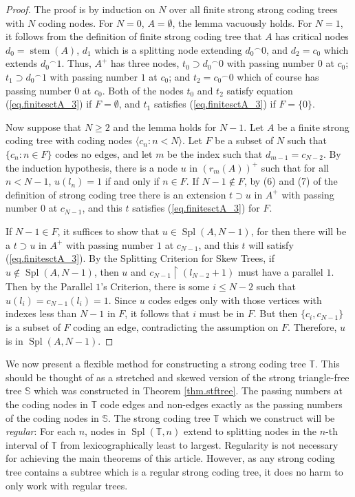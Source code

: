 \documentclass{amsart}
\theoremstyle{remark}
\theoremstyle{definition}
\theoremstyle{remark}
\DeclareMathOperator{\stem}{stem}
\DeclareMathOperator{\Spl}{Spl}
\newcommand{\re}{\restriction}
\newcommand{\bT}{\mathbb{T}}
\newcommand{\bS}{\mathbb{S}}
\newcommand{\lgl}{\langle}
\newcommand{\rgl}{\rangle}
\newcommand{\POC}{Parallel $1$'s Criterion}
\begin{document}
\begin{proof}
The proof is by induction on $N$ over all finite  strong  strong coding trees with $N$ coding nodes.
For $N=0$, $A=\emptyset$, the lemma vacuously holds.
For $N=1$,
it follows from the definition of finite strong coding tree that
$A$ has critical nodes $d_0=\stem(A)$, $d_1$ which is a splitting node extending ${d_0}^{\frown}0$,
and $d_2=c_0$ which extends ${d_0}^{\frown}1$.
Thus, $A^+$ has three nodes, $t_0\supset {d_0}^{\frown}0$ with passing number $0$ at $c_0$;
$t_1\supset {d_0}^{\frown}1$ with passing number $1$ at $c_0$;
and $t_2={c_0}^{\frown}0$ which of course has passing number $0$ at $c_0$.
Both of the nodes $t_0$ and $t_2$ satisfy equation (\ref{eq.finitesctA_3}) if $F=\emptyset$,
and $t_1$ satisfies (\ref{eq.finitesctA_3}) if $F=\{0\}$.


Now suppose that $N\ge 2$ and  the lemma holds for  $N-1$.
Let $A$ be a finite strong coding tree with coding nodes $\lgl c_n:n<N\rgl$.
Let $F$ be a subset of $N$ such that $\{c_n:n\in F\}$ codes no edges,
and let $m$ be the index such that $d_{m-1}=c_{N-2}$.
By the induction hypothesis, there is a node $u$ in
$(r_m(A))^+$ such that
for all $n<N-1$, $u(l_n)=1$ if and only if $n\in F$.
If  $N-1\not\in F$,
by (6) and (7) of the definition of strong coding tree
there is an extension $t\supset u$ in $A^+$ with passing number $0$ at $c_{N-1}$,
and this $t$ satisfies (\ref{eq.finitesctA_3}) for $F$.


If  $N-1\in F$,
it suffices to show that $u\in\Spl(A,N-1)$,
for then there will be a $t\supset u$ in $A^+$ with passing number $1$ at $c_{N-1}$, and this $t$ will satisfy
(\ref{eq.finitesctA_3}).
By the Splitting Criterion for Skew Trees,
if $u\not\in\Spl(A,N-1)$,
then $u$ and $c_{N-1}\re (l_{N-2}+1)$ must have a parallel $1$.
Then by the \POC,
 there is some $i\le N-2$ such that $u(l_i)=c_{N-1}(l_i)=1$.
Since  $u$ codes edges only with those vertices with indexes
less than $N-1$  in $F$,
it follows that $i$ must be in $F$.
But then $\{c_i,c_{N-1}\}$ is a subset of $F$ coding an edge, contradicting the assumption on $F$.
Therefore,  $u$ is in $\Spl(A,N-1)$.
\end{proof}



We now present a flexible method for constructing a strong coding tree $\bT$.
This should be thought of as a stretched and skewed version of the strong triangle-free tree $\bS$ which was constructed in Theorem \ref{thm.stftree}.
The passing numbers at the coding  nodes in $\bT$ code edges and non-edges  exactly as the passing numbers of the coding nodes in $\bS$.
The  strong coding tree  $\bT$ which  we  construct will be {\em regular}:
  For each $n$,
nodes in $\Spl(\bT,n)$ extend to splitting nodes in the $n$-th interval of $\bT$  from lexicographically  least to largest.
Regularity is not necessary for achieving the main theorems of this article.
 However,  as any strong coding tree  contains a subtree which is  a regular strong coding tree,
it does no harm
to  only work with regular trees.
\end{document}
